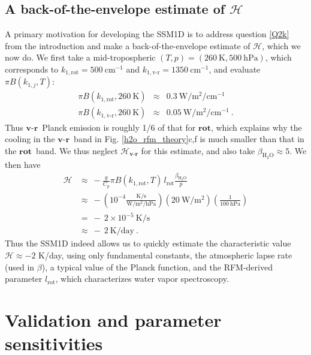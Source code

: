 \documentclass{ametsoc}
\newcommand{\beqn}{\begin{equation}}
\newcommand{\eeqn}{\end{equation}}
\newcommand{\beqa}{\begin{eqnarray}}
\newcommand{\eeqa}{\end{eqnarray}}
\newcommand{\n}{\nonumber}
\newcommand{\second}{\ensuremath{\mathrm{s}}}
\newcommand{\Kelvin}{\ensuremath{\mathrm{K}}}
\newcommand{\Wmsq}{\ensuremath{\mathrm{W/m^2}}}
\newcommand{\cminverse}{\ensuremath{\mathrm{cm^{-1}}}}
\newcommand{\hPa}{\ensuremath{\mathrm{hPa}}}
\newcommand{\Cp}{\ensuremath{C_p}}
\newcommand{\htwo}{\ensuremath{\mathrm{H_2O}}}
\newcommand{\ch}{\ensuremath{\mathcal{H}}}
\newcommand{\konerot}{\ensuremath{k_{1,\mathrm{rot}}}}
\newcommand{\konevr}{\ensuremath{k_{1,\text{v-r}}}}
\newcommand{\konej}{\ensuremath{k_{1,j}}}
\newcommand{\lrot}{\ensuremath{l_\mathrm{rot}}}
\newcommand{\vr}{\ensuremath{\textbf{v-r}}}
\newcommand{\rot}{\ensuremath{\textbf{rot}}}
\begin{document}
\subsection{A back-of-the-envelope estimate of \ch} \label{sec_2k}
 A primary motivation for developing the SSM1D is to address question \ref{Q2k} from the introduction and make a back-of-the-envelope estimate of \ch, which we now do.   We first take a mid-tropospheric $(T,p)=(260\ \Kelvin,500\ \hPa)$, which corresponds to $\konerot=500\ \cminverse$ and $\konevr=1350\ \cminverse$, and evaluate $\pi B(\konej,T)$:
\beqa
	 \pi B(\konerot,260\ \Kelvin) & \approx & 0.3 \ \Wmsq/\cminverse \n \\ 
	 \pi B(\konevr,260\ \Kelvin)  & \approx  & 0.05 \ \Wmsq/\cminverse \n \ .
\eeqa 
Thus \vr\ Planck emission is roughly 1/6 of that for \rot, which explains why the cooling in the \vr\ band in Fig. \ref{h2o_rfm_theory}c,f is much smaller than that in the \rot\ band. We thus neglect $\ch_\vr$ for this estimate, and  also take $\beta_\htwo \approx 5$. We then have
\beqn
	\begin{split}
  		\ch & \approx \ - \frac{g}{\Cp}\pi B(\konerot,T)\, \lrot \frac{\beta_{\htwo}}{p} \\
     		  & \approx \ - \left(10^{-4}\frac{\Kelvin/\second}{\Wmsq/\hPa}\right)(20\ \Wmsq)\left(\frac{1}{100\ \hPa}\right)  \\
    			  & = \ -\ 2 \times 10^{-5}\ \Kelvin/\second \\
    		  	  & \approx \ -\ 2\ \text{K/day} \ .
	\end{split}
	 \label{2k_est}
\eeqn
 Thus the SSM1D indeed allows us to quickly estimate the characteristic value  $\ch \approx -2$ K/day, using only fundamental constants, the atmospheric lapse rate (used in $\beta$), a typical value of the Planck function, and the RFM-derived parameter \lrot, which characterizes  water vapor spectroscopy. 

\section{Validation and parameter sensitivities} \label{sec_validation}
 
\end{document}
